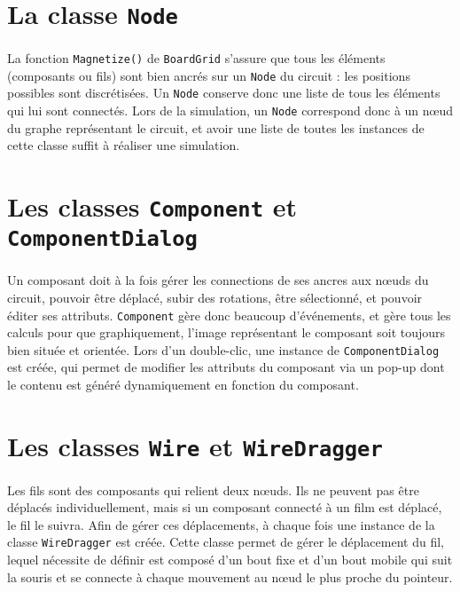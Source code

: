 \section{La classe \lstinline|Node|}

\paragraph{}La fonction \lstinline|Magnetize()| de \lstinline|BoardGrid| s'assure que tous les éléments (composants ou fils) sont bien ancrés sur un \lstinline|Node| du circuit : les positions possibles sont discrétisées. Un \lstinline|Node| conserve donc une liste de tous les éléments qui lui sont connectés. Lors de la simulation, un \lstinline|Node| correspond donc à un nœud du graphe représentant le circuit, et avoir une liste de toutes les instances de cette classe suffit à réaliser une simulation.


\section{Les classes \lstinline|Component| et \lstinline|ComponentDialog|}

\paragraph{}Un composant doit à la fois gérer les connections de ses ancres aux nœuds du circuit, pouvoir être déplacé, subir des rotations, être sélectionné, et pouvoir éditer ses attributs. \lstinline|Component| gère donc beaucoup d'événements, et gère tous les calculs pour que graphiquement, l'image représentant le composant soit toujours bien située et orientée. Lors d'un double-clic, une instance de \lstinline|ComponentDialog| est créée, qui permet de modifier les attributs du composant via un pop-up dont le contenu est généré dynamiquement en fonction du composant.


\section{Les classes \lstinline|Wire| et \lstinline|WireDragger|}

\paragraph{}Les fils sont des composants qui relient deux nœuds. Ils ne peuvent pas être déplacés individuellement, mais si un composant connecté à un film est déplacé, le fil le suivra. Afin de gérer ces déplacements, à chaque fois une instance de la classe \lstinline|WireDragger| est créée. Cette classe permet de gérer le déplacement du fil, lequel nécessite de définir est composé d'un bout fixe et d'un bout mobile qui suit la souris et se connecte à chaque mouvement au nœud le plus proche du pointeur.

\paragraph{}
